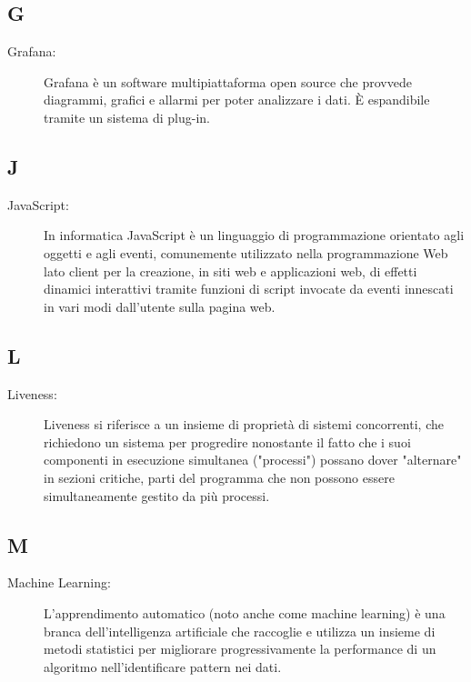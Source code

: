 \documentclass[../manuale-utente.tex]{subfiles}
\begin{document}
\subsection*{G}
\begin{description}
  \item[Grafana:] Grafana è un software multipiattaforma open source che provvede diagrammi, grafici e allarmi per poter analizzare i dati. È espandibile tramite un sistema di plug-in.
\end{description}

\subsection*{J}
\begin{description}
  \item[JavaScript:] In informatica JavaScript è un linguaggio di programmazione orientato agli oggetti e agli eventi, comunemente utilizzato nella programmazione Web lato client per la creazione, in siti web e applicazioni web, di effetti dinamici interattivi tramite funzioni di script invocate da eventi innescati in vari modi dall'utente sulla pagina web.
\end{description}

\subsection*{L}
\begin{description}
  \item[Liveness:] Liveness si riferisce a un insieme di proprietà di sistemi concorrenti, che richiedono un sistema per progredire nonostante il fatto che i suoi componenti in esecuzione simultanea ("processi") possano dover "alternare" in sezioni critiche, parti del programma che non possono essere simultaneamente gestito da più processi.
\end{description}

\subsection*{M}
\begin{description}
  \item[Machine Learning:] L’apprendimento automatico (noto anche come machine learning) è una branca dell'intelligenza artificiale che raccoglie e utilizza un insieme di metodi statistici per migliorare progressivamente la performance di un algoritmo nell'identificare pattern nei dati.
\end{description}
\end{document}
